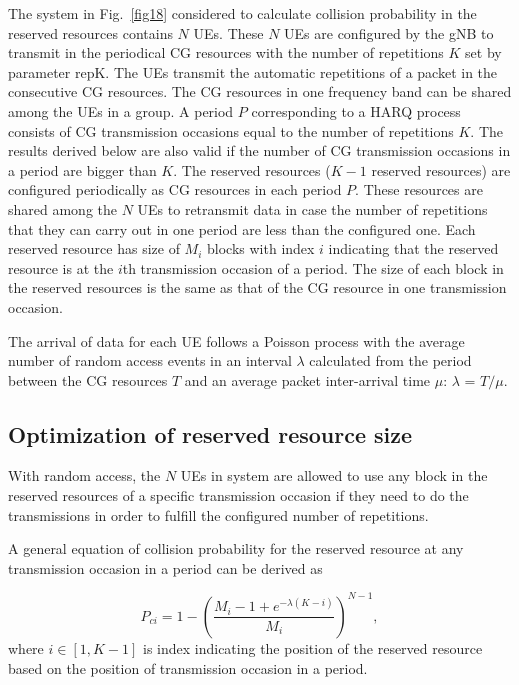 \documentclass{report}
\begin{document}
The system in Fig.~\ref{fig18} considered to calculate collision probability in the reserved resources contains $N$ UEs. These $N$ UEs are configured by the gNB to transmit in the periodical CG resources with the number of repetitions $K$ set by parameter repK. The UEs transmit the automatic repetitions of a packet in the consecutive CG resources. The CG resources in one frequency band can be shared among the UEs in a group. A period $P$ corresponding to a HARQ process consists of CG transmission occasions equal to the number of repetitions $K$. The results derived below are also valid if the number of CG transmission occasions in a period are bigger than $K$. The reserved resources ($K-1$ reserved resources) are configured periodically as CG resources in each period $P$. These resources are shared among the $N$ UEs to retransmit data in case the number of repetitions that they can carry out in one period are less than the configured one. Each reserved resource has size of $M_{i}$ blocks with index $i$ indicating that the reserved resource is at the $i$th transmission occasion of a period. The size of each block in the reserved resources is the same as that of the CG resource in one transmission occasion.

The arrival of data for each UE follows a Poisson process with the average number of random access events in an interval $\lambda$ calculated from the period between the CG resources $T$ and an average packet inter-arrival time $\mu$: $\lambda$ = $T/\mu$.

\subsection{Optimization of reserved resource size}

With random access, the $N$ UEs in system are allowed to use any block in the reserved resources of a specific transmission occasion if they need to do the transmissions in order to fulfill the configured number of repetitions.

A general equation of collision probability for the reserved resource at any transmission occasion in a period can be derived as \useshortskip

\begin{equation}
P_{ci} = 1 - (\frac{M_{i}-1+e^{-\lambda(K-i)}}{M_{i}})^{N-1},\label{eq7}
\end{equation}
where
$i \in [1, K-1]$ is index indicating the position of the reserved resource based on the position of transmission occasion in a period.
\end{document}
